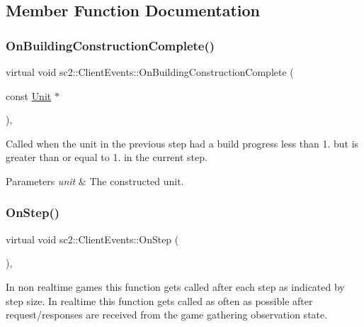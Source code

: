 \subsection{Member Function Documentation}
\mbox{\label{classsc2_1_1_client_events_ad920d34fe6c49487373800dd1ec45757}} 
\subsubsection{\texorpdfstring{On\+Building\+Construction\+Complete()}{OnBuildingConstructionComplete()}}
{\footnotesize\ttfamily virtual void sc2\+::\+Client\+Events\+::\+On\+Building\+Construction\+Complete (\begin{DoxyParamCaption}\item[{const \hyperlink{classsc2_1_1_unit}{Unit} $\ast$}]{ }\end{DoxyParamCaption})\hspace{0.3cm}{\ttfamily [inline]}, {\ttfamily [virtual]}}

Called when the unit in the previous step had a build progress less than 1. but is greater than or equal to 1. in the current step. 
\begin{DoxyParams}{Parameters}
{\em unit} & The constructed unit. \\
\hline
\end{DoxyParams}
\mbox{\label{classsc2_1_1_client_events_a6f5839e220d2a5a19b30065e0b8290c4}} 
\subsubsection{\texorpdfstring{On\+Step()}{OnStep()}}
{\footnotesize\ttfamily virtual void sc2\+::\+Client\+Events\+::\+On\+Step (\begin{DoxyParamCaption}{ }\end{DoxyParamCaption})\hspace{0.3cm}{\ttfamily [inline]}, {\ttfamily [virtual]}}

In non realtime games this function gets called after each step as indicated by step size. In realtime this function gets called as often as possible after request/responses are received from the game gathering observation state. \mbox{\label{classsc2_1_1_client_events_ac7fc1dae3607d7e4fea5680bcea903a0}} 
